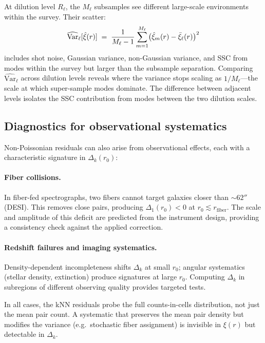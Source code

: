 At dilution level $R_\ell$, the $M_\ell$ subsamples see different large-scale environments within the survey.  Their scatter:
\begin{equation}
  \widehat{\mathrm{Var}}_\ell[\hat{\xi}(r)] \;=\; \frac{1}{M_\ell - 1}\sum_{m=1}^{M_\ell} \bigl(\hat{\xi}_m(r) - \bar{\xi}_\ell(r)\bigr)^2
  \label{eq:subsample_var}
\end{equation}
includes shot noise, Gaussian variance, non-Gaussian variance, and SSC from modes within the survey but larger than the subsample separation.  Comparing $\widehat{\mathrm{Var}}_\ell$ across dilution levels reveals where the variance stops scaling as $1/M_\ell$---the scale at which super-sample modes dominate.  The difference between adjacent levels isolates the SSC contribution from modes between the two dilution scales.

\subsection{Diagnostics for observational systematics}
\label{sec:systematics}

Non-Poissonian residuals can also arise from observational effects, each with a characteristic signature in $\Delta_k(r_0)$:

\paragraph{Fiber collisions.}  In fiber-fed spectrographs, two fibers cannot target galaxies closer than $\sim 62''$ (DESI).  This removes close pairs, producing $\Delta_1(r_0) < 0$ at $r_0 \lesssim r_{\mathrm{fiber}}$.  The scale and amplitude of this deficit are predicted from the instrument design, providing a consistency check against the applied correction.

\paragraph{Redshift failures and imaging systematics.}  Density-dependent incompleteness shifts $\Delta_k$ at small $r_0$; angular systematics (stellar density, extinction) produce signatures at large $r_0$.  Computing $\Delta_k$ in subregions of different observing quality provides targeted tests.

In all cases, the kNN residuals probe the full counts-in-cells distribution, not just the mean pair count.  A systematic that preserves the mean pair density but modifies the variance (e.g.\ stochastic fiber assignment) is invisible in $\xi(r)$ but detectable in $\Delta_k$.

